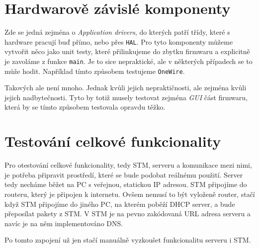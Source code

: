 \section{Hardwarově závislé komponenty}
Zde se jedná zejména o \emph{Application drivers}, do kterých patří třídy, které s hardware pracují
buď přímo, nebo přes \texttt{HAL}.
Pro tyto komponenty můžeme vytvořit něco jako unit testy, které přilinkujeme do zbytku firmwaru a explicitně
je zavoláme z funkce \texttt{main}.
Je to sice nepraktické, ale v některých případech se to může hodit.
Například tímto způsobem testujeme \texttt{OneWire}.

Takových  ale není mnoho.
Jednak kvůli jejich nepraktičnosti, ale zejména kvůli jejich nadbytečnosti.
Tyto  by totiž musely testovat zejména \emph{GUI} část firmwaru, která by se tímto způsobem
testovala opravdu těžko.

\section{Testování celkové funkcionality}
Pro otestování celkové funkcionality, tedy STM, serveru a komunikace mezi nimi, je potřeba připravit
prostředí, které se bude podobat reálnému použití.
Server tedy necháme běžet na PC s veřejnou, statickou IP adresou.
STM připojíme do routeru, který je připojen k internetu.
Ovšem nemusí to být vyloženě router, stačí když STM připojíme do jiného PC, na kterém poběží
DHCP server, a bude přeposílat pakety z STM.
V STM je na pevno zakódovaná URL adresa serveru a navíc je na něm implementováno DNS.

Po tomto zapojení už jen stačí manuálně vyzkoušet funkcionalitu serveru i STM.

